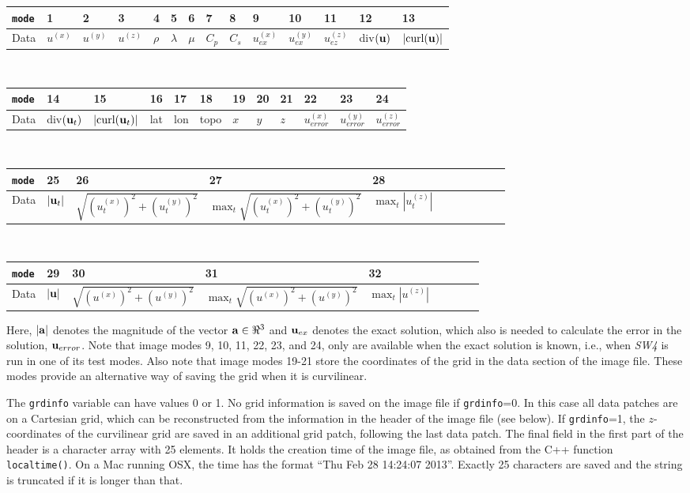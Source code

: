 \documentclass[11pt]{report}
\newcommand{\ub}{{\bf u}}
\begin{document}
\begin{flushleft}
\begin{tabular}{l||l|l|l|l|l|l|l|l|l|l|l|l|l}\hline
{\tt mode} & 1 & 2 & 3 & 4 & 5 & 6 & 7 & 8 & 9 & 10 & 11 & 12 & 13\\ \hline
Data & $u^{(x)}$ & $u^{(y)}$ & $u^{(z)}$ & $\rho$ & $\lambda$ & $\mu$ & $C_p$ & $C_s$ & $u_{ex}^{(x)}$
& $u_{ex}^{(y)}$ & $u_{ez}^{(z)}$ & div$(\ub)$ & $|\mbox{curl($\ub$)}|$ \\ \hline
\end{tabular}\\
\medskip
\begin{tabular}{l||l|l|l|l|l|l|l|l|l|l|l}\hline
{\tt mode}  & 14 & 15 & 16 & 17 & 18 & 19 & 20 & 21 & 22 & 23 & 24 \\ \hline\hline
Data & div$(\ub_t)$ & $|\mbox{curl($\ub_t$)}|$ & lat & lon &
topo & $x$ & $y$ & $z$ & $u_{error}^{(x)}$ & $u_{error}^{(y)}$ & $u_{error}^{(z)}$  \\ \hline
\end{tabular}\\
\medskip
\begin{tabular}{l||l|l|l|lllllll}\hline
{\tt mode} & 25 & 26 & 27 & 28 \\ \hline
Data & $|\ub_t|$ & $\sqrt{(u_t^{(x)})^2+(u_t^{(y)})^2}$ & $\max_t\sqrt{(u_t^{(x)})^2+(u_t^{(y)})^2}$
& $\max_t \left| u^{(z)}_t \right|$ 
\\ \hline
\end{tabular}\\
\medskip
\begin{tabular}{l||l|l|l|lllll}\hline
{\tt mode} & 29 & 30 & 31 & 32 \\ \hline
Data & $|\ub|$ & $\sqrt{(u^{(x)})^2+(u^{(y)})^2}$ & $\max_t\sqrt{(u^{(x)})^2+(u^{(y)})^2}$ & $\max_t
\left| u^{(z)} \right|$ \\ \hline 
\end{tabular}
\end{flushleft}
Here, $|{\bf a}|$ denotes the magnitude of the vector ${\bf a}\in\Re^3$ and $\ub_{ex}$ denotes the
exact solution, which also is needed to calculate the error in the solution, $\ub_{error}$. Note
that image modes 9, 10, 11, 22, 23, and 24, only are available when the exact solution is known,
i.e., when \emph{SW4} is run in one of its test modes. Also note that image modes 19-21 store the
coordinates of the grid in the data section of the image file. These modes provide an alternative
way of saving the grid when it is curvilinear.

The {\tt grdinfo} variable can have values 0 or 1. No grid information is saved on the image file if
{\tt grdinfo}=0. In this case all data patches are on a Cartesian grid, which can be reconstructed
from the information in the header of the image file (see below). If {\tt grdinfo}=1, the
$z$-coordinates of the curvilinear grid are saved in an additional grid patch, following
the last data patch. The final field in the first part of the header is a character array with 25
elements. It holds the creation time of the image file, as obtained from the C++ function {\tt
  localtime()}. On a Mac running OSX, the time has the format ``Thu Feb 28 14:24:07 2013''. Exactly
25 characters are saved and the string is truncated if it is longer than that.
\end{document}

